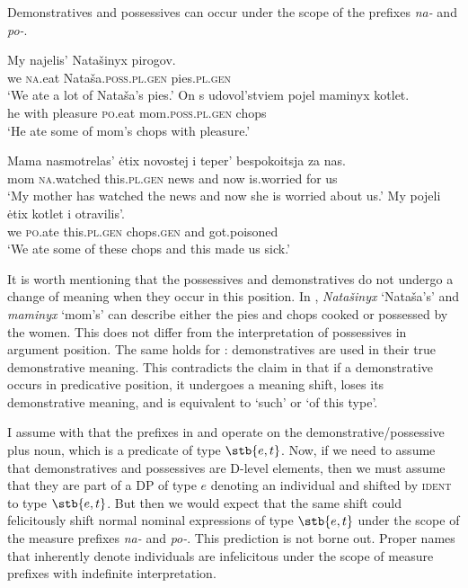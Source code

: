 \documentclass[output=paper,
colorlinks,
citecolor=brown,
newtxmath
]{langscibook}
\begin{document}
Demonstratives and possessives can occur under the scope of the prefixes \textit{na-} and \textit{po-}. 


\ea\label{pirogi_kotlet}
    \ea \gll My najelis' Natašinyx pirogov.\\
    we {\textsc{na}.eat} Nataša.\textsc{poss.pl.gen} pies.\textsc{pl.gen}\\     %
    \glt `We ate a lot of Nataša's pies.'
    \ex \gll On s udovol'stviem pojel maminyx kotlet.\\
    he with pleasure {\textsc{po}.eat} mom.\textsc{poss.pl.gen} chops\\
    \glt `He ate some of mom's chops with pleasure.'
\z\z 


\ea\label{novosti} 
    \ea \gll Mama nasmotrelas' ėtix novostej i teper' bespokoitsja za nas.\\
    mom {\textsc{na}.watched} this.\textsc{pl.gen} news and now is.worried for us\\
    \glt `My mother has watched the news and now she is worried about us.'
    \ex \gll My pojeli ėtix kotlet i otravilis'.\\
    we {\textsc{po}.ate} this.\textsc{pl.gen} chops.\textsc{gen} and got.poisoned\\
    \glt `We ate some of these chops and this made us sick.'
\z\z

\noindent It is worth mentioning that the possessives and demonstratives do not undergo a change of meaning when they occur in this position. In , \textit{Natašinyx} `Nataša's' and \textit{maminyx} `mom's' can describe either the pies and chops cooked or possessed by the women. This does not differ from the interpretation of possessives in argument position. The same holds for :  demonstratives are used in their true demonstrative meaning. This contradicts the claim in \citet{Kagan.Pereltsvaig2014} that if a demonstrative occurs in predicative position, it undergoes a meaning shift, loses its demonstrative meaning, and is equivalent to `such' or `of this type'. 

I assume with \citet{Filip2005} that the prefixes in  and  operate on the demonstrative/possessive plus noun, which is a predicate of type $\stb{e,t}$. Now, if we need to assume that demonstratives and possessives are D-level elements, then we must assume that they are part of a DP of type $e$ denoting an individual and shifted by \textsc{ident} to type $\stb{e,t}$. But then we would expect that the same shift could felicitously shift normal nominal expressions of type $\stb{e,t}$ under the scope of the measure prefixes \textit{na-} and \textit{po-}. This prediction is not borne out. Proper names that inherently denote individuals are infelicitous under the scope of measure prefixes with indefinite interpretation.
\end{document}
